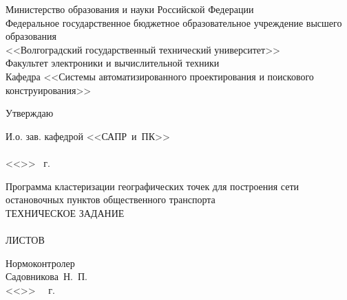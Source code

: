 \thispagestyle{empty}
\begin{center}
    Министерство образования и науки Российской Федерации \\
    Федеральное государственное бюджетное образовательное учреждение высшего образования\\
    <<Волгоградский государственный технический университет>>\\
    Факультет электроники и вычислительной техники\\
    Кафедра <<Системы автоматизированного проектирования и поискового конструирования>>
    \vspace{1em}
\end{center}
\begin{flushright}
    \begin{center}
        \hspace*{9.7em}Утверждаю
    \end{center}
    И.о. зав. кафедрой <<САПР~и~ПК>>\\
    \hspace{.5em}\\
    \vspace{.5em}<<\underline{\hspace{2.5em}}>> \underline{\hspace{8.5em}} \the\year\ г.
\end{flushright}
\vspace{1em}
\begin{center}
    Программа кластеризации географических точек для построения сети остановочных пунктов общественного транспорта\\
    ТЕХНИЧЕСКОЕ ЗАДАНИЕ\\
    \vspace{2em}
    \ORDERT\\
    ЛИСТОВ \pageref{LastPage}
\end{center}
\vspace{3em}
\begin{minipage}[t]{0.6\textwidth}
    \vspace{4em}
    \begin{flushleft}
        Нормоконтролер\\
        Садовникова~Н.~П.\\
        <<\LINE{1.5em}>>\ \LINE{7em} \the\year\ г.
    \end{flushleft}
\end{minipage}
